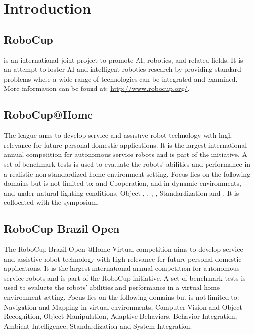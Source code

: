 \chapter{Introduction}
\label{chap:introduction}


\section{RoboCup}
\label{sec:introduction:robocup}
\RoboCup{} is an international joint project to promote AI, robotics, and related fields. It is an attempt to foster AI and intelligent robotics research by providing standard problems where a wide range of technologies can be integrated and examined. More information can be found at:
{\small\url{http://www.robocup.org/}}.


\section{RoboCup@Home}
\label{sec:introduction:robocupathome}
The \AtHome{} league aims to develop service and assistive robot technology with high relevance for future personal domestic applications. It is the largest international annual competition for autonomous service robots and is part of the \RoboCup{} initiative. A set of benchmark tests is used to evaluate the robots' abilities and performance in a realistic non-standardized home environment setting. Focus lies on the following domains but is not limited to: \HRI{} and Cooperation, \NAV{} and \MAP{} in dynamic environments, \CV{} and \OR{} under natural lighting conditions, Object \MAN{}, \AB{}, \BI{}, \AmI{}, Standardization and \SysI{}. It is collocated with the \RoboCup{} symposium.

\section{RoboCup Brazil Open}
\label{sec:introduction:RBO}

The RoboCup Brazil Open @Home Virtual competition aims to develop service and assistive robot technology with high relevance for future personal domestic applications. It is the largest international annual competition for autonomous service robots and is part of the RoboCup initiative. A set of benchmark tests is used to evaluate the robots’ abilities and performance in a virtual home environment setting. Focus lies on the following domains but is not limited to: Navigation and Mapping in virtual environments, Computer Vision and Object Recognition, Object Manipulation, Adaptive Behaviors, Behavior Integration, Ambient Intelligence, Standardization and System Integration. 



% 

% 



% 

